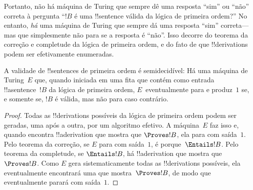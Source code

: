 \documentclass[../../../include/open-logic-section]{subfiles}
\begin{document}
\begin{explain}
Portanto, não há máquina de Turing que sempre dê uma resposta ``sim''
ou ``não'' correta à pergunta ``$!B$ é uma !!{sentence} válida da
lógica de primeira ordem?'' No entanto, \emph{há} uma máquina de
Turing que sempre dá uma resposta ``sim'' correta---mas que
simplesmente não para se a resposta é ``não''. Isso decorre do teorema
da correção e completude da lógica de primeira ordem, e do fato de que
!!{derivation}s podem ser efetivamente enumeradas.
\end{explain}

\begin{thm}
  A validade de !!{sentence}s de primeira ordem é semidecidível: Há
  uma máquina de Turing~$E$ que, quando iniciada em uma fita que
  contém como entrada !!a{sentence}~$!B$ da lógica de primeira ordem,
  $E$~eventualmente para e produz~$1$ se, e somente se, $!B$ é válida,
  mas não para caso contrário.
\end{thm}

\begin{proof}
  Todas as !!{derivation}s possíveis da lógica de primeira ordem podem
  ser geradas, uma após a outra, por um algoritmo efetivo.  A
  máquina~$E$ faz isso e, quando encontra !!a{derivation} que mostra
  que $\Proves !B$, ela para com saída~$1$. Pelo teorema da correção,
  se $E$ para com saída~$1$, é porque~$\Entails !B$. Pelo teorema da
  completude, se $\Entails !B$, há !!a{derivation} que mostra
  que~$\Proves !B$. Como $E$ gera sistematicamente todas as
  !!{derivation}s possíveis, ela eventualmente encontrará uma que
  mostra~$\Proves !B$, de modo que eventualmente parará com saída~$1$.
\end{proof}
\end{document}
